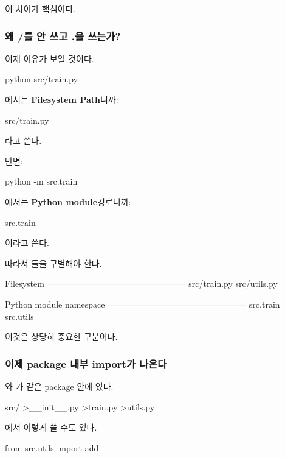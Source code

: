 이 차이가 핵심이다.

\subsubsection{왜 /를 안 쓰고 .을 쓰는가?}

이제 이유가 보일 것이다.

\begin{dhkzsh}
python src/train.py
\end{dhkzsh}

에서는 \textbf{Filesystem Path}니까:

\begin{dhkzsh}
src/train.py
\end{dhkzsh}

라고 쓴다.

반면:

\begin{dhkzsh}
python -m src.train
\end{dhkzsh}

에서는 \textbf{Python module}경로니까:

\begin{dhkzsh}
src.train
\end{dhkzsh}

이라고 쓴다.

따라서 둘을 구별해야 한다.

\begin{dhksmry}
    Filesystem
    ───────────────────────
    src/train.py
    src/utils.py



    Python module namespace
    ───────────────────────
    src.train
    src.utils
\end{dhksmry}

이것은 상당히 중요한 구분이다.

\subsubsection{이제 package 내부 import가 나온다}

와 가 같은  package 안에 있다.

\begin{dhkdir}
src/
>__init__.py
>train.py
>utils.py
\end{dhkdir}

에서 이렇게 쓸 수도 있다.

\begin{dhkcode}
from src.utils import add
\end{dhkcode}

